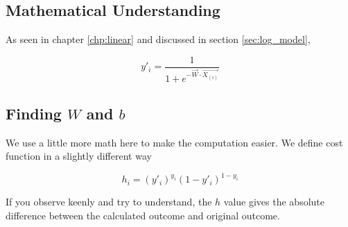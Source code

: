 \subsection{Mathematical Understanding}
As seen in chapter \ref{chp:linear} and discussed in section \ref{sec:log_model}, 

\begin{equation}
    y'_i = \frac{1}{1 + e^{-\vec{W} \cdot \vec{X_{(i)}}}}
\end{equation}

\subsection{Finding $W$ and $b$}
We use a little more math here to make the computation easier.
We define cost function in a slightly different way

\begin{equation}
    h_i = {(y'_i)}^{y_i}{(1-y'_i)}^{1-y_{i}}
\end{equation}

If you observe keenly and try to understand, the $h$ value gives the absolute difference between
the calculated outcome and original outcome.